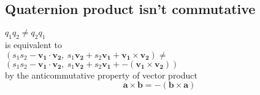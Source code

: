 \subsection{Quaternion product isn't commutative}
$q_1 q_2 \neq q_2 q_1$  \\
is equivalent to \\
$(s_1 s_2 - \boldsymbol{v_1 \cdot v_2}, \ s_1 \boldsymbol{v_2} + s_2 \boldsymbol{v_1} + \boldsymbol{v_1} \times \boldsymbol{v_2}) \neq $
$(s_1 s_2 - \boldsymbol{v_1 \cdot v_2}, \ s_1 \boldsymbol{v_2} + s_2 \boldsymbol{v_1} + - (\boldsymbol{v_1} \times \boldsymbol{v_2}))$ \\
by the anticommutative property of vector product \cite{amslaurea6701} \\
$$ \boldsymbol{a} \times \boldsymbol{b} = - (\boldsymbol{b} \times \boldsymbol{a}) $$ 

